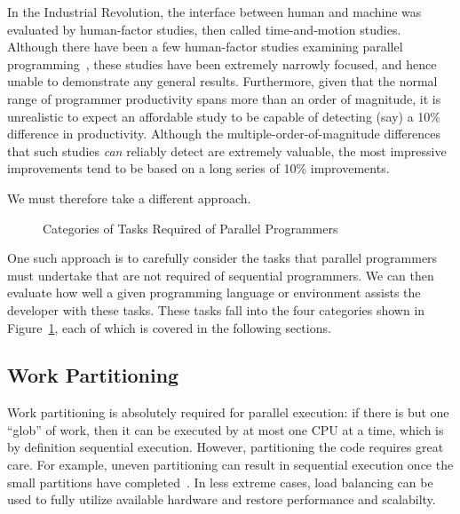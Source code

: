 In the Industrial Revolution, the interface between human and machine
was evaluated by human-factor studies, then called time-and-motion
studies.
Although there have been a few human-factor studies examining parallel
programming~\cite{RyanEccles2005HPCSNovice,RyanEccles2006HPCSNoviceNeeds,
LorinHochstein2005SC,DuaneSzafron1994PEMPDS}, these studies have
been extremely narrowly focused, and hence unable to demonstrate any
general results.
Furthermore, given that the normal range of programmer productivity
spans more than an order of magnitude, it is unrealistic to expect
an affordable study to be capable of detecting (say) a 10\% difference
in productivity.
Although the multiple-order-of-magnitude differences that such studies
\emph{can} reliably detect are extremely valuable, the most impressive
improvements tend to be based on a long series of 10\% improvements.

We must therefore take a different approach.

\begin{figure}[tb]
\begin{center}
\end{center}
\caption{Categories of Tasks Required of Parallel Programmers}
\label{fig:intro:Categories of Tasks Required of Parallel Programmers}
\end{figure}

One such approach is to carefully consider the tasks that parallel
programmers must undertake that are not required of sequential programmers.
We can then evaluate how well a given programming language or environment
assists the developer with these tasks.
These tasks fall into the four categories shown in
Figure~\ref{fig:intro:Categories of Tasks Required of Parallel Programmers},
each of which is covered in the following sections.

\subsection{Work Partitioning}
\label{sec:intro:Work Partitioning}

Work partitioning is absolutely required for parallel execution:
if there is but one ``glob'' of work, then it can be executed by at
most one CPU at a time, which is by definition sequential execution.
However, partitioning the code requires great care.
For example, uneven partitioning can result in sequential execution
once the small partitions have completed~\cite{GeneAmdahl1967AmdahlsLaw}.
In less extreme cases, load balancing can be used to fully utilize
available hardware and restore performance and scalabilty.

